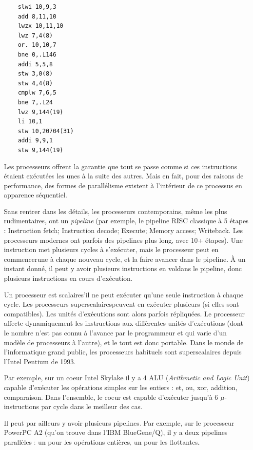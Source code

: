 \begin{verbatim}
	slwi 10,9,3
	add 8,11,10
	lwzx 10,11,10
	lwz 7,4(8)
	or. 10,10,7
	bne 0,.L146
	addi 5,5,8
	stw 3,0(8)
	stw 4,4(8)
	cmplw 7,6,5
	bne 7,.L24
	lwz 9,144(19)
	li 10,1
	stw 10,20704(31)
	addi 9,9,1
	stw 9,144(19)
\end{verbatim}

Les processeurs offrent la garantie que tout se passe comme si ces instructions
étaient exécutées les unes à la suite des autres. Mais en fait, pour des raisons
de performance, des formes de parallélisme existent à l'intérieur de ce
processus en apparence séquentiel.

Sans rentrer dans les détails, les processeurs contemporains, même les plus
rudimentaires, ont un \textit{pipeline} (par exemple, le pipeline RISC classique
à 5 étapes : Instruction fetch; Instruction decode; Execute; Memory access;
Writeback. Les processeurs modernes ont parfois des pipelines plus long, avec
10+ étapes). Une instruction met plusieurs cycles à s'exécuter, mais le
processeur peut en \og commencer\fg une à chaque nouveau cycle, et la faire
avancer dans le pipeline. À un instant donné, il peut y avoir plusieurs
instructions \og en vol\fg dans le pipeline, donc plusieurs instructions en
cours d'exécution.

Un processeur est \og scalaire\fg s'il ne peut exécuter qu'une seule instruction
à chaque cycle. Les processeurs \og superscalaires\fg peuvent en exécuter
plusieurs (si elles sont compatibles). Les unités d'exécutions sont alors
parfois répliquées. Le processeur affecte dynamiquement les instructions aux
différentes unités d'exécutions (dont le nombre n'est pas connu à l'avance par
le programmeur et qui varie d'un modèle de processeurs à l'autre), et le tout
est donc portable. Dans le monde de l'informatique grand public, les processeurs
habituels sont superscalaires depuis l'Intel Pentium de 1993.

Par exemple, sur un coeur Intel Skylake il y a 4 ALU (\textit{Arithmetic and
  Logic Unit}) capable d'exécuter les opérations simples sur les entiers : et,
ou, xor, addition, comparaison. Dans l'ensemble, le coeur est capable d'exécuter
jusqu'à 6 $\mu$-instructions par cycle dans le meilleur des cas.

Il peut par ailleurs y avoir plusieurs pipelines. Par exemple, sur le processeur
PowerPC A2 (qu'on trouve dans l'IBM BlueGene/Q), il y a deux pipelines
parallèles : un pour les opérations entières, un pour les flottantes.

